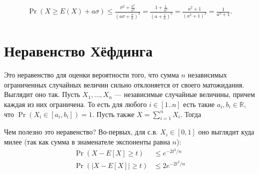 \documentclass[12pt]{article}
\newcommand\R{\mathbb{R}}
\begin{document}
\begin{align*}
  \Pr(X \ge E(X) + a\sigma) \le \frac{\sigma^2+ \frac{\sigma^2}{a^2}}{(a\sigma + \frac{\sigma}{a})^2} = \frac{1 + \frac{1}{a^2}}{\left(a + \frac{1}{a}\right)^2} = \frac{a^2 + 1}{(a^2 + 1)^2} = \frac{1}{a^2 + 1}.
\end{align*}

\section{Неравенство Хёфдинга}

Это неравенство для оценки вероятности того, что сумма $n$ независимых ограниченных случайных величин сильно отклоняется от своего матожидания. Выглядит оно так. Пусть $X_1, \dots, X_n$ --- независимые случайные величины, причем каждая из них ограничена. То есть для любого $i \in [1..n]$ есть такие $a_i, b_i \in \R$, что $\Pr(X_i \in [a_i, b_i]) = 1$. Пусть также $X = \sum_{i = 1}^n X_i$. Тогда
\begin{center}
\end{center}
\begin{center}
\end{center}

Чем полезно это неравенство? Во-первых, для с.в. $X_i \in [0, 1]$ оно выглядит куда милее (так как сумма в знаменателе экспоненты равна $n$):
\begin{align*}
  \Pr(X - E[X] \ge t) &\le e^{-2t^2/n} \\
  \Pr(|X - E[X]| \ge t) &\le 2e^{-2t^2/n}
\end{align*}
\end{document}
